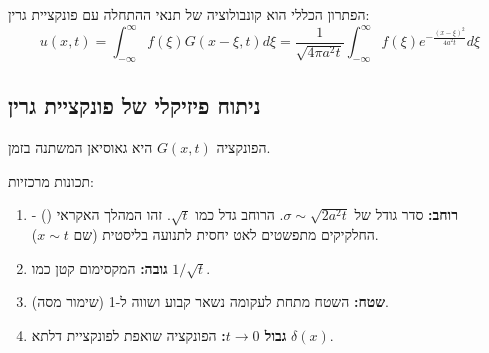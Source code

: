 הפתרון הכללי הוא קונבולוציה של תנאי ההתחלה עם פונקציית גרין:
\begin{equation}
    u(x,t) = \int_{-\infty}^{\infty} f(\xi) G(x-\xi, t) d\xi = \frac{1}{\sqrt{4\pi a^2 t}} \int_{-\infty}^{\infty} f(\xi) e^{-\frac{(x-\xi)^2}{4a^2 t}} d\xi
\end{equation}

\subsection{ניתוח פיזיקלי של פונקציית גרין}
הפונקציה $G(x,t)$ היא גאוסיאן המשתנה בזמן.

\begin{center}
\end{center}

תכונות מרכזיות:
\begin{enumerate}
    \item \textbf{רוחב:} סדר גודל של $\sigma \sim \sqrt{2 a^2 t}$. הרוחב גדל כמו $\sqrt{t}$. זהו המהלך האקראי () - החלקיקים מתפשטים לאט יחסית לתנועה בליסטית (שם $x \sim t$).
    \item \textbf{גובה:} המקסימום קטן כמו $1/\sqrt{t}$.
    \item \textbf{שטח:} השטח מתחת לעקומה נשאר קבוע ושווה ל-1 (שימור מסה).
    \item \textbf{גבול $t \to 0$:} הפונקציה שואפת לפונקציית דלתא $\delta(x)$.
\end{enumerate}

